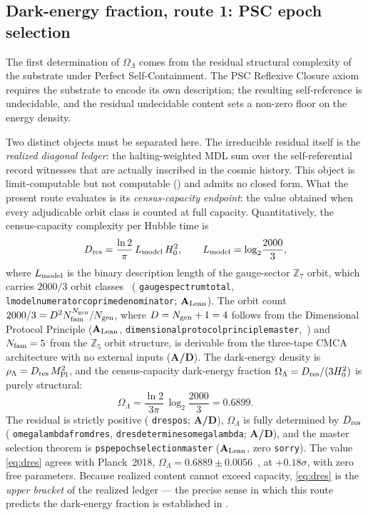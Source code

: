 \documentclass[11pt]{article}
\theoremstyle{remark}
\newcommand{\ZS}{\mathbb{Z}_7}
\newcommand{\lean}[1]{%
  \penalty-100
  \begingroup\def\_{\textunderscore\allowbreak}\texttt{#1}\endgroup}
\newcommand{\MPl}{M_{\rm Pl}}
\newcommand{\Hnought}{H_0}
\newcommand{\OmL}{\Omega_\Lambda}
\newcommand{\Dres}{D_{\rm res}}
\newcommand{\Lmodel}{L_{\rm model}}
\newcommand{\CatAL}{\ensuremath{\textbf{A}_{\rm Lean}}}
\newcommand{\CatAD}{\textbf{A/D}}
\begin{document}
\subsection{Dark-energy fraction, route 1: PSC epoch selection}
\label{sec:cc-dres}

The first determination of $\OmL$ comes from the residual structural complexity of
the substrate under Perfect Self-Containment. The PSC Reflexive Closure axiom
requires the substrate to encode its own description; the resulting self-reference
is undecidable, and the residual undecidable content sets a non-zero floor on the
energy density.

Two distinct objects must be separated here. The irreducible residual itself is
the \emph{realized diagonal ledger}: the halting-weighted MDL sum over the
self-referential record witnesses that are actually inscribed in the cosmic
history. This object is limit-computable but not computable
() and admits no closed form. What the present route
evaluates is its \emph{census-capacity endpoint}: the value obtained when every
adjudicable orbit class is counted at full capacity. Quantitatively, the
census-capacity complexity per Hubble time is
\begin{equation}
  \Dres = \frac{\ln 2}{\pi}\,\Lmodel\,\Hnought^2,
  \qquad
  \Lmodel = \log_2\!\frac{2000}{3},
\end{equation}
where $\Lmodel$ is the binary description length of the gauge-sector $\ZS$ orbit,
which carries $2000/3$ orbit classes~\cite{SpivackGTEUnification}
(\lean{gauge\_spectrum\_total}, \lean{lmodel\_numerator\_coprime\_denominator};
\CatAL). The orbit count $2000/3 = D^2 N_{\rm fam}^{N_{\rm gen}}/N_{\rm gen}$,
where $D = N_{\rm gen}+1 = 4$ follows from the Dimensional Protocol Principle
(\CatAL, \lean{dimensional\_protocol\_principle\_master},~\cite{SpivackThreeTapeCMCA})
and $N_{\rm fam} = 5$ from the $\mathbb{Z}_5$ orbit structure, is derivable from
the three-tape CMCA architecture with no external inputs (\CatAD).
The dark-energy density is $\rho_\Lambda = \Dres\,\MPl^2$, and the
census-capacity dark-energy fraction $\OmL = \Dres/(3\Hnought^2)$ is purely
structural:
\begin{equation}
  \boxed{\ \OmL = \frac{\ln 2}{3\pi}\,\log_2\!\frac{2000}{3} = 0.6899.\ }
  \label{eq:dres}
\end{equation}
The residual is strictly positive (\lean{d\_res\_pos}; \CatAD), $\OmL$ is fully
determined by $\Dres$ (\lean{omega\_lambda\_from\_d\_res},
\lean{d\_res\_determines\_omega\_lambda}; \CatAD), and the master selection theorem
is \lean{psp\_epoch\_selection\_master} (\CatAL, zero \texttt{sorry}). The value
\eqref{eq:dres} agrees with Planck~2018, $\OmL = 0.6889 \pm 0.0056$~\cite{Planck2018},
at $+0.18\sigma$, with zero free parameters. Because realized content cannot
exceed capacity, \eqref{eq:dres} is the \emph{upper bracket} of the realized
ledger --- the precise sense in which this route predicts the dark-energy
fraction is established in .
\end{document}
